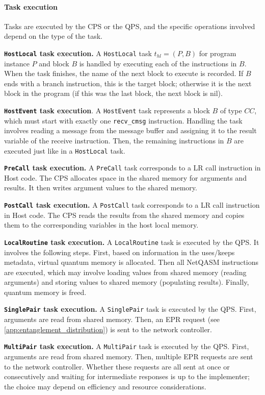 \paragraph{Task execution}
Tasks are executed by the CPS or the QPS, and the specific operations involved depend on the type of the task.

\textbf{\texttt{HostLocal} task execution.} A \texttt{HostLocal} task $t_{hl} = (P, B)$ for program instance $P$ and block $B$ is handled by executing each of the instructions in $B$. When the task finishes, the name of the next block to execute is recorded. If $B$ ends with a branch instruction, this is the target block; otherwise it is the next block in the program (if this was the last block, the next block is nil).

\textbf{\texttt{HostEvent} task execution}. A \texttt{HostEvent} task represents a block $B$ of type $CC$, which must start with exactly one \texttt{recv\_cmsg} instruction. Handling the task involves reading a message from the message buffer and assigning it to the result variable of the receive instruction. Then, the remaining instructions in $B$ are executed just like in a \texttt{HostLocal} task.


\textbf{\texttt{PreCall} task execution.} A \texttt{PreCall} task corresponds to a LR call instruction in Host code. The CPS allocates space in the shared memory for arguments and results. It then writes argument values to the shared memory.

\textbf{\texttt{PostCall} task execution.} A \texttt{PostCall} task corresponds to a LR call instruction in Host code. The CPS reads the results from the shared memory and copies them to the corresponding variables in the host local memory.

\textbf{\texttt{LocalRoutine} task execution.} A \texttt{LocalRoutine} task is executed by the QPS. It involves the following steps. First, based on information in the uses/keeps metadata, virtual quantum memory is allocated. Then all NetQASM instructions are executed, which may involve loading values from shared memory (reading arguments) and storing values to shared memory (populating results). Finally, quantum memory is freed.

\textbf{\texttt{SinglePair} task execution.} A \texttt{SinglePair} task is executed by the QPS. First, arguments are read from shared memory. Then, an EPR request (see \cref{app:entanglement_distribution}) is sent to the network controller.

\textbf{\texttt{MultiPair} task execution.} A \texttt{MultiPair} task is executed by the QPS. First, arguments are read from shared memory. Then, multiple EPR requests are sent to the network controller. Whether these requests are all sent at once or consecutively and waiting for intermediate responses is up to the implementer; the choice may depend on efficiency and resource considerations.

